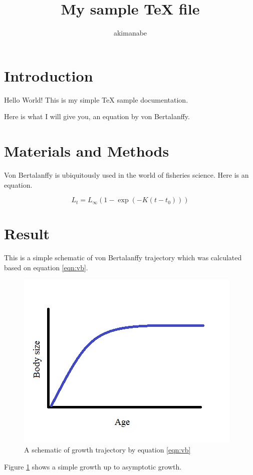 \documentclass[a4paper,dvipdfmx]{jsarticle}
\begin{document}
\title{My sample TeX file}
\author{akimanabe}
\date{}

\maketitle

\section{Introduction}
Hello World! This is my simple TeX sample documentation.

Here is what I will give you, an equation by von Bertalanffy.

\section{Materials and Methods}

Von Bertalanffy is ubiquitously used in the world of fisheries science. Here is an equation.

\begin{equation}
\label{eqn:vb}
L_t = L_\infty (1-\exp(-K(t-t_0)))
\end{equation}

\section{Result}

This is a simple schematic of von Bertalanffy trajectory which was calculated based on equation \ref{eqn:vb}.

\begin{figure}
  \includegraphics[width = \linewidth]{figs/samplevb.png}
  \caption{A schematic of growth trajectory by equation \ref{eqn:vb}}
  \label{fig:vb}
\end{figure}

Figure \ref{fig:vb} shows a simple growth up to asymptotic growth.
\end{document}
